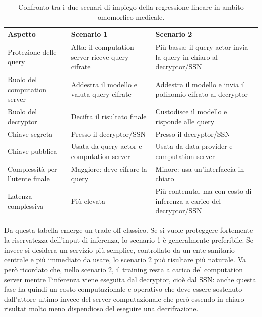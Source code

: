 \begin{table}[h]
\centering
\begin{tabular}{|p{3.3cm}|p{5.2cm}|p{5.2cm}|}
\hline
\textbf{Aspetto} & \textbf{Scenario 1} & \textbf{Scenario 2} \\
\hline
Protezione delle query & Alta: il computation server riceve query cifrate & Pi\`u bassa: il query actor invia la query in chiaro al decryptor/SSN \\
\hline
Ruolo del computation server & Addestra il modello e valuta query cifrate & Addestra il modello e invia il polinomio cifrato al decryptor \\
\hline
Ruolo del decryptor & Decifra il risultato finale & Custodisce il modello e risponde alle query \\
\hline
Chiave segreta & Presso il decryptor/SSN & Presso il decryptor/SSN \\
\hline
Chiave pubblica & Usata da query actor e computation server & Usata da data provider e computation server \\
\hline
Complessit\`a per l'utente finale & Maggiore: deve cifrare la query & Minore: usa un'interfaccia in chiaro \\
\hline
Latenza complessiva & Pi\`u elevata & Pi\`u contenuta, ma con costo di inferenza a carico del decryptor/SSN \\
\hline
\end{tabular}
\caption{Confronto tra i due scenari di impiego della regressione lineare in ambito omomorfico-medicale.}
\label{tab:confronto_scenari}
\end{table}

Da questa tabella emerge un trade-off classico. Se si vuole proteggere fortemente la riservatezza dell'input di inferenza, lo scenario 1 \`e generalmente preferibile. Se invece si desidera un servizio pi\`u semplice, controllato da un ente sanitario centrale e pi\`u immediato da usare, lo scenario 2 pu\`o risultare pi\`u naturale. Va per\`o ricordato che, nello scenario 2, il training resta a carico del computation server mentre l'inferenza viene eseguita dal decryptor, cio\`e dal SSN: anche questa fase ha quindi un costo computazionale e operativo che deve essere sostenuto dall'attore ultimo invece del server computazionale che però essendo in chiaro risultat molto meno dispendioso del eseguire una decrifrazione.

